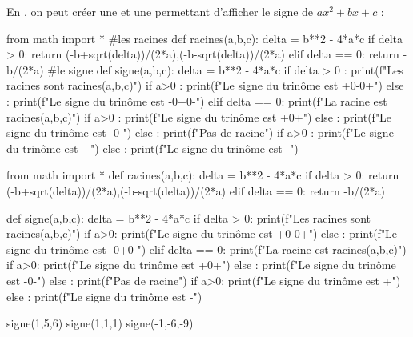 \documentclass[a4paper,11pt]{article}
\begin{document}
\begin{calgo}
En \calgpython, on peut créer une  et une  permettant d'afficher le signe de $ax^2+bx+c$ :

\begin{tcpythoncode}[15cm]
	\begin{pyverbatim}[][fontsize=\footnotesize,numbers=left,numbersep=10pt]
		from math import *
		#les racines
		def racines(a,b,c):
			delta = b**2 - 4*a*c
			if delta > 0:
				return (-b+sqrt(delta))/(2*a),(-b-sqrt(delta))/(2*a)
			elif delta == 0:
				return -b/(2*a)
		#le signe
		def signe(a,b,c):
			delta = b**2 - 4*a*c
			if delta > 0 :
				print(f"Les racines sont {racines(a,b,c)}")
				if a>0 : print(f"Le signe du trinôme est +0-0+")
				else : print(f"Le signe du trinôme est -0+0-")
			elif delta == 0:
				print(f"La racine est {racines(a,b,c)}")
				if a>0 : print(f"Le signe du trinôme est +0+")
				else : print(f"Le signe du trinôme est -0-")
			else :
				print(f"Pas de racine")
				if a>0 : print(f"Le signe du trinôme est +")
				else : print(f"Le signe du trinôme est -")
	\end{pyverbatim}
\end{tcpythoncode}

\begin{pyconcode}
from math import *
def racines(a,b,c):
	delta = b**2 - 4*a*c
	if delta > 0:
		return (-b+sqrt(delta))/(2*a),(-b-sqrt(delta))/(2*a)
	elif delta == 0:
		return -b/(2*a)
	

def signe(a,b,c):
	delta = b**2 - 4*a*c
	if delta > 0:
		print(f"Les racines sont {racines(a,b,c)}")
		if a>0:
			print(f"Le signe du trinôme est +0-0+")
		else :
			print(f"Le signe du trinôme est -0+0-")
	elif delta == 0:
		print(f"La racine est {racines(a,b,c)}")
		if a>0:
			print(f"Le signe du trinôme est +0+")
		else :
			print(f"Le signe du trinôme est -0-")
	else :
		print(f"Pas de racine")
		if a>0:
			print(f"Le signe du trinôme est +")
		else :
			print(f"Le signe du trinôme est -")


\end{pyconcode}

\begin{consolepython}[15cm]
\begin{pyconsole}[][framesep=3mm,frame=single,label={[\scriptsize Début de la console \logopython]\scriptsize Fin de la console \logopython},fontsize=\footnotesize,framerule=1pt,rulecolor=\color{ForestGreen}]
signe(1,5,6)
signe(1,1,1)
signe(-1,-6,-9)
\end{pyconsole}
\end{consolepython}
\smallskip
\end{calgo}
\end{document}
